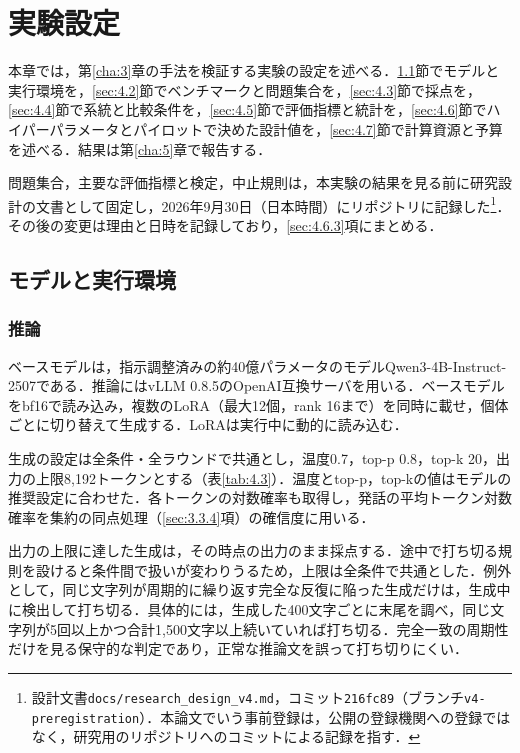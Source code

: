 

\chapter{実験設定}
\label{cha:4}

本章では，第\ref{cha:3}章の手法を検証する実験の設定を述べる．\ref{sec:4.1}節でモデルと実行環境を，\ref{sec:4.2}節でベンチマークと問題集合を，\ref{sec:4.3}節で採点を，\ref{sec:4.4}節で系統と比較条件を，\ref{sec:4.5}節で評価指標と統計を，\ref{sec:4.6}節でハイパーパラメータとパイロットで決めた設計値を，\ref{sec:4.7}節で計算資源と予算を述べる．結果は第\ref{cha:5}章で報告する．

問題集合，主要な評価指標と検定，中止規則は，本実験の結果を見る前に研究設計の文書として固定し，2026年9月30日（日本時間）にリポジトリに記録した\footnote{設計文書\texttt{docs/research\_design\_v4.md}，コミット\texttt{216fc89}（ブランチ\texttt{v4-preregistration}）．本論文でいう事前登録は，公開の登録機関への登録ではなく，研究用のリポジトリへのコミットによる記録を指す．}．その後の変更は理由と日時を記録しており，\ref{sec:4.6.3}項にまとめる．

\section{モデルと実行環境}
\label{sec:4.1}

\subsection{推論}
\label{sec:4.1.1}

ベースモデルは，指示調整済みの約40億パラメータのモデルQwen3-4B-Instruct-2507\cite{qwen2025qwen3}である．推論にはvLLM 0.8.5\cite{kwon2023efficient}のOpenAI互換サーバを用いる．ベースモデルをbf16で読み込み，複数のLoRA（最大12個，rank 16まで）を同時に載せ，個体ごとに切り替えて生成する．LoRAは実行中に動的に読み込む．

生成の設定は全条件・全ラウンドで共通とし，温度0.7，top-p 0.8，top-k 20，出力の上限8,192トークンとする（表\ref{tab:4.3}）．温度とtop-p，top-kの値はモデルの推奨設定に合わせた．各トークンの対数確率も取得し，発話の平均トークン対数確率を集約の同点処理（\ref{sec:3.3.4}項）の確信度に用いる．

出力の上限に達した生成は，その時点の出力のまま採点する．途中で打ち切る規則を設けると条件間で扱いが変わりうるため，上限は全条件で共通とした．例外として，同じ文字列が周期的に繰り返す完全な反復に陥った生成だけは，生成中に検出して打ち切る．具体的には，生成した400文字ごとに末尾を調べ，同じ文字列が5回以上かつ合計1,500文字以上続いていれば打ち切る．完全一致の周期性だけを見る保守的な判定であり，正常な推論文を誤って打ち切りにくい．

